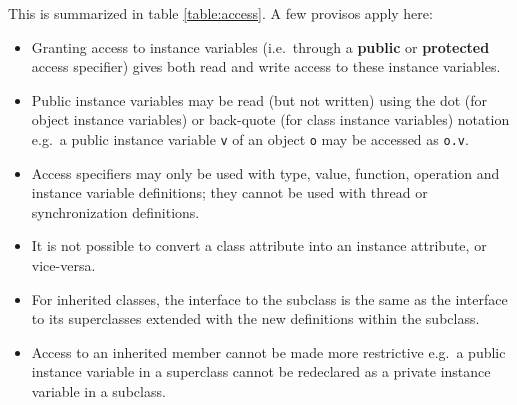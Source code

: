 \documentclass{overturerepchap}
\newcommand{\keyw}[1]{{\bf\ttfamily #1}}
\begin{document}
This is summarized in table \ref{table:access}. A few provisos apply
here: 
\begin{itemize}
\item Granting access to instance variables (i.e.\ through
a \keyw{public} or \keyw{protected} access specifier) gives 
both read and write access to these instance variables.
\item Public instance variables may be read (but not written) using
  the dot (for object instance variables) or back-quote (for class
  instance variables) notation e.g.\ a public instance variable
  \texttt{v} of an object \texttt{o} may be accessed as \texttt{o.v}.
\item Access specifiers may only be used with type, value, function,
  operation and instance variable definitions; they cannot be used
  with thread or synchronization definitions.
\item It is not possible to convert a class attribute into an instance
  attribute, or vice-versa.
\item For inherited classes, the interface to the subclass is the same
  as the interface to its superclasses extended with the new
  definitions within the subclass.  
\item Access to an inherited member cannot be made more restrictive
  e.g.\ a public instance variable in a superclass cannot be
  redeclared as a private instance variable in a subclass.
\end{itemize} 
\end{document}
